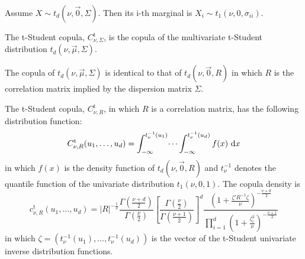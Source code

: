 \documentclass[11pt,fleqn]{book} %
\begin{document}
\begin{proposition}
	Assume $X \sim t_d(\nu,\vec{0},\Sigma)$. Then its i-th marginal is 
	$X_i \sim t_1(\nu,0,\sigma_{ii})$.
\end{proposition}

\begin{definition}
	The t-Student copula, $C_{\nu,\Sigma}^{\text{t}}$, is the copula of the 
	multivariate t-Student distribution $t_d(\nu,\vec{\mu},\Sigma)$.
\end{definition}

\begin{proposition}
	The copula of $t_d(\nu,\vec{\mu},\Sigma)$ is identical to that of 
	$t_d(\nu,\vec{0},R)$ in which $R$ is the correlation matrix implied by 
	the dispersion matrix $\Sigma$.
\end{proposition}

\begin{proposition}
	The t-Student copula, $C_{\nu,R}^{\text{t}}$, in which $R$ is a 
	correlation matrix, has the following distribution function:
	\begin{displaymath}
		C_{\nu,R}^{\text{t}}(u_1, \dots, u_d) = 
		\int_{-\infty}^{t_\nu^{-1}(u_1)} \dots \int_{-\infty}^{t_\nu^{-1}(u_d)} f(x) \mathop{\,\mathrm{{}d}}\mathopen{} x
	\end{displaymath}
	in which $f(x)$ is the density function of $t_d(\nu,\vec{0},R)$ and 
	$t_{\nu}^{-1}$ denotes the quantile function of the univariate distribution 
	$t_1(\nu,0,1)$. The copula density is
	\begin{displaymath}
		\label{eq:density}
		c_{\nu,R}^{\text{t}}(u_1,\dots,u_d) =
		|R|^{-\frac{1}{2}} 
		\displaystyle\frac{\Gamma{\left(\frac{\nu+d}{2}\right)}}{\Gamma{\left(\frac{\nu}{2}\right)}}
		\displaystyle\left[ \frac{\Gamma{\left(\frac{\nu}{2}\right)}}{\Gamma{\left(\frac{\nu+1}{2}\right)}} \right]^d
		\frac{\displaystyle\left( 1+\frac{\zeta' R^{-1} \zeta}{\nu}\right)^{-\frac{\nu+d}{2}}}{\displaystyle\prod_{i=1}^d \left( 1+\frac{\zeta_i^2}{\nu} \right)^{-\frac{\nu+1}{2}}}
	\end{displaymath}
	\noindent
	in which $\zeta=(t_\nu^{-1}(u_1), \dots, t_\nu^{-1}(u_d))$ is the vector 
	of the t-Student univariate inverse distribution functions.
\end{proposition}

\end{document}
